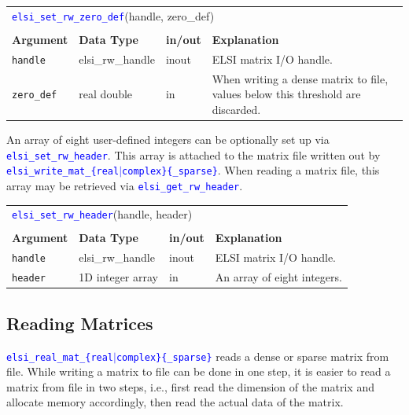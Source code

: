 \documentclass{report}
\newcommand{\api}[1]{\textcolor{blue}{\texttt{#1}}}
\begin{document}
\begin{tabular}[]{|p{20mm}|p{40mm}|p{10mm}|p{92mm}|}
\multicolumn{4}{l}{\api{elsi\_set\_rw\_zero\_def}(handle, zero\_def)}\\
\multicolumn{4}{l}{}\\
\hline
\multicolumn{1}{|l|}{\textbf{Argument}} & \multicolumn{1}{l|}{\textbf{Data Type}} & \multicolumn{1}{l|}{\textbf{in/out}} & \multicolumn{1}{l|}{\textbf{Explanation}}\\
\hline
\texttt{handle}    & elsi\_rw\_handle & inout & ELSI matrix I/O handle.\\
\hline
\texttt{zero\_def} & real double      & in    & When writing a dense matrix to file, values below this threshold are discarded.\\
\hline
\end{tabular}

An array of eight user-defined integers can be optionally set up via \api{elsi\_set\_rw\_header}. This array is attached to the matrix file written out by \api{elsi\_write\_mat\_\{real$\vert$complex\}\{\_sparse\}}. When reading a matrix file, this array may be retrieved via \api{elsi\_get\_rw\_header}.

\begin{tabular}[]{|p{20mm}|p{40mm}|p{10mm}|p{92mm}|}
\multicolumn{4}{l}{\api{elsi\_set\_rw\_header}(handle, header)}\\
\multicolumn{4}{l}{}\\
\hline
\multicolumn{1}{|l|}{\textbf{Argument}} & \multicolumn{1}{l|}{\textbf{Data Type}} & \multicolumn{1}{l|}{\textbf{in/out}} & \multicolumn{1}{l|}{\textbf{Explanation}}\\
\hline
\texttt{handle} & elsi\_rw\_handle & inout & ELSI matrix I/O handle.\\
\hline
\texttt{header} & 1D integer array & in    & An array of eight integers.\\
\hline
\end{tabular}

\subsection{Reading Matrices}
\label{subsec:rw_read}
\api{elsi\_real\_mat\_\{real$\vert$complex\}\{\_sparse\}} reads a dense or sparse matrix from file. While writing a matrix to file can be done in one step, it is easier to read a matrix from file in two steps, i.e., first read the dimension of the matrix and allocate memory accordingly, then read the actual data of the matrix.
\end{document}
